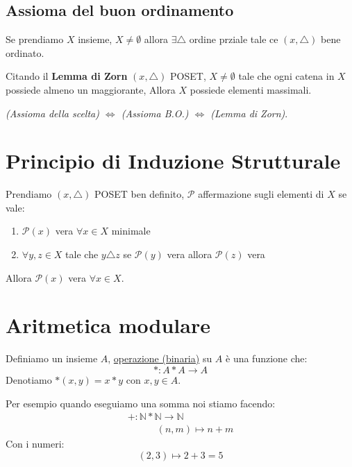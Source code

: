 \documentclass{article}
\begin{document}
\subsection{Assioma del buon ordinamento}\label{Assioma_del_buon_ordinamento}
Se prendiamo $X$ insieme, $X \not = \emptyset$ allora $\exists \triangle$ ordine prziale tale ce $(x,\triangle)$ bene ordinato. \par

Citando il \textbf{Lemma di Zorn} $(x, \triangle)$ POSET, $X \not = \emptyset$ tale che ogni catena in $X$ possiede almeno un maggiorante, Allora $X$ possiede elementi massimali. \par
\textit{(Assioma della scelta) $\Leftrightarrow$ (Assioma B.O.)  $\Leftrightarrow$ (Lemma di Zorn)}. \par






\newpage
\section{Principio di Induzione Strutturale}

Prendiamo $(x,\triangle)$ POSET ben definito, $\mathcal{P}$ affermazione sugli elementi di $X$ se vale:

\begin{enumerate}
        \item $\mathcal{P}(x)$ vera $\forall x \in X$ minimale
        \item $\forall y,z \in X $ tale che $y \triangle z$ se $\mathcal{P}(y)$ vera allora $\mathcal{P}(z)$ vera 
\end{enumerate}
Allora $\mathcal{P}(x)$ vera $\forall x \in X$.







\newpage
\section{Aritmetica modulare}

Definiamo un insieme $ A $, \underline{operazione (binaria)} su $ A $ è una funzione che:
\begin{equation*}
        * : A * A \to A
\end{equation*}
Denotiamo $*(x,y) = x*y$ con $ x,y \in A $. \par
Per esempio quando eseguiamo una somma noi stiamo facendo:
\begin{align*}
        + : \mathbb{N}*\mathbb{N} \to \mathbb{N} \\
        \quad \quad \quad (n,m) \mapsto n + m
\end{align*}
Con i numeri:
\begin{equation*}
        (2,3) \mapsto 2 + 3 = 5
\end{equation*}
\end{document}
